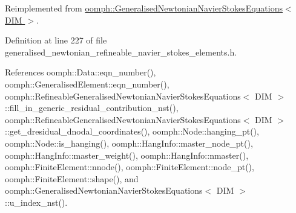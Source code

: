 Reimplemented from \hyperlink{classoomph_1_1GeneralisedNewtonianNavierStokesEquations_a063505006e63d4a65f90f7a6409a9401}{oomph\+::\+Generalised\+Newtonian\+Navier\+Stokes\+Equations$<$ D\+I\+M $>$}.



Definition at line 227 of file generalised\+\_\+newtonian\+\_\+refineable\+\_\+navier\+\_\+stokes\+\_\+elements.\+h.



References oomph\+::\+Data\+::eqn\+\_\+number(), oomph\+::\+Generalised\+Element\+::eqn\+\_\+number(), oomph\+::\+Refineable\+Generalised\+Newtonian\+Navier\+Stokes\+Equations$<$ D\+I\+M $>$\+::fill\+\_\+in\+\_\+generic\+\_\+residual\+\_\+contribution\+\_\+nst(), oomph\+::\+Refineable\+Generalised\+Newtonian\+Navier\+Stokes\+Equations$<$ D\+I\+M $>$\+::get\+\_\+dresidual\+\_\+dnodal\+\_\+coordinates(), oomph\+::\+Node\+::hanging\+\_\+pt(), oomph\+::\+Node\+::is\+\_\+hanging(), oomph\+::\+Hang\+Info\+::master\+\_\+node\+\_\+pt(), oomph\+::\+Hang\+Info\+::master\+\_\+weight(), oomph\+::\+Hang\+Info\+::nmaster(), oomph\+::\+Finite\+Element\+::nnode(), oomph\+::\+Finite\+Element\+::node\+\_\+pt(), oomph\+::\+Finite\+Element\+::shape(), and oomph\+::\+Generalised\+Newtonian\+Navier\+Stokes\+Equations$<$ D\+I\+M $>$\+::u\+\_\+index\+\_\+nst().

\mbox{\label{classoomph_1_1RefineableGeneralisedNewtonianNavierStokesEquations_abb7fde3310709225b8f9fbedfb7eca58}} 
